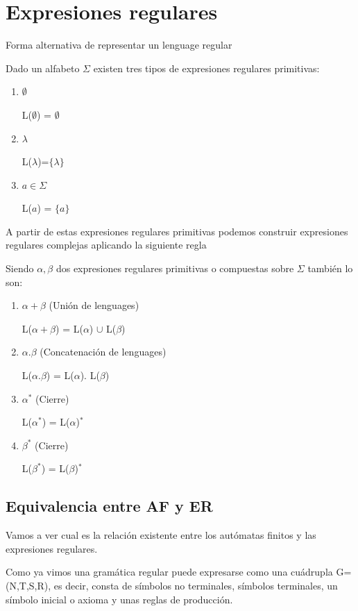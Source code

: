 \documentclass{apuntes}
\begin{document}
\chapter{Expresiones regulares}
\begin{defn}
Forma alternativa de representar un lenguage regular
\end{defn}

Dado un alfabeto $\Sigma$ existen tres tipos de expresiones regulares primitivas:
\begin{enumerate}
\item $\emptyset$ 

L($\emptyset$) = $\emptyset$
\item $\lambda$

 L($\lambda$)=$\lbrace \lambda \rbrace$
\item $a\in \Sigma$ 

L($a$) = $\lbrace a \rbrace$
\end{enumerate}

A partir de estas expresiones regulares primitivas podemos construir expresiones regulares complejas aplicando la siguiente regla

Siendo $\alpha, \beta$ dos expresiones regulares primitivas o compuestas sobre $\Sigma$ también lo son:
\begin{enumerate}
\item $\alpha + \beta$ (Unión de lenguages)

L($\alpha + \beta$) = L($\alpha $) $\cup$ L($\beta$)
\item $\alpha . \beta$ (Concatenación de lenguages)

L($\alpha . \beta$) = L($\alpha $). L($\beta$)
\item $\alpha^*$ (Cierre)

L($\alpha^*$) = L($\alpha$)$^*$
\item $\beta^*$ (Cierre)

L($\beta^*$) = L($\beta$)$^*$
\end{enumerate}

\section{Equivalencia entre AF y ER}
Vamos a ver cual es la relación existente entre los autómatas finitos y las expresiones regulares.

Como ya vimos una gramática regular puede expresarse como una cuádrupla G=(N,T,S,R), es decir, consta de símbolos no terminales, símbolos terminales, un símbolo inicial o axioma y unas reglas de producción.
\end{document}
